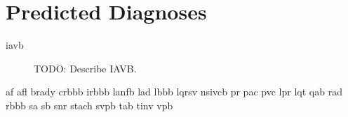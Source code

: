 \documentclass[\main/thesis.tex]{subfiles}
\begin{document}
\section{Predicted Diagnoses}

\begin{description}
    \item[\gls{iavb}] TODO: Describe IAVB.
\end{description}

\gls{af}
\gls{afl}
\gls{brady}
\gls{crbbb}
\gls{irbbb}
\gls{lanfb}
\gls{lad}
\gls{lbbb}
\gls{lqrsv}
\gls{nsivcb}
\gls{pr}
\gls{pac}
\gls{pvc}
\gls{lpr}
\gls{lqt}
\gls{qab}
\gls{rad}
\gls{rbbb}
\gls{sa}
\gls{sb}
\gls{snr}
\gls{stach}
\gls{svpb}
\gls{tab}
\gls{tinv}
\gls{vpb}


\end{document}
